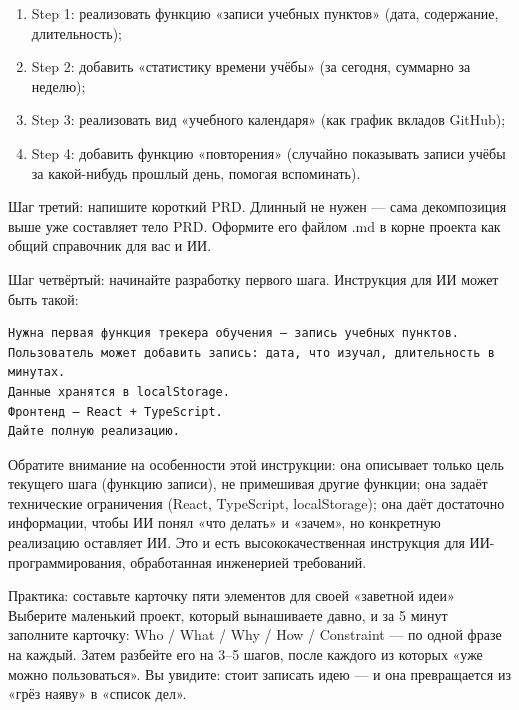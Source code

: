 \begin{enumerate}
  \item Step 1: реализовать функцию «записи учебных пунктов» (дата, содержание, длительность);
  \item Step 2: добавить «статистику времени учёбы» (за сегодня, суммарно за неделю);
  \item Step 3: реализовать вид «учебного календаря» (как график вкладов GitHub);
  \item Step 4: добавить функцию «повторения» (случайно показывать записи учёбы за какой-нибудь прошлый день, помогая вспоминать).
\end{enumerate}

Шаг третий: напишите короткий PRD. Длинный не нужен — сама декомпозиция выше уже составляет тело PRD. Оформите его файлом .md в корне проекта как общий справочник для вас и ИИ.

Шаг четвёртый: начинайте разработку первого шага. Инструкция для ИИ может быть такой:

\begin{lstlisting}
Нужна первая функция трекера обучения — запись учебных пунктов.
Пользователь может добавить запись: дата, что изучал, длительность в минутах.
Данные хранятся в localStorage.
Фронтенд — React + TypeScript.
Дайте полную реализацию.
\end{lstlisting}

Обратите внимание на особенности этой инструкции: она описывает только цель текущего шага (функцию записи), не примешивая другие функции; она задаёт технические ограничения (React, TypeScript, localStorage); она даёт достаточно информации, чтобы ИИ понял «что делать» и «зачем», но конкретную реализацию оставляет ИИ. Это и есть высококачественная инструкция для ИИ-программирования, обработанная инженерией требований.

\begin{tcbpractice}{Практика: составьте карточку пяти элементов для своей «заветной идеи»}
Выберите маленький проект, который вынашиваете давно, и за 5 минут заполните карточку: Who / What / Why / How / Constraint — по одной фразе на каждый. Затем разбейте его на 3–5 шагов, после каждого из которых «уже можно пользоваться». Вы увидите: стоит записать идею — и она превращается из «грёз наяву» в «список дел».

\end{tcbpractice}

